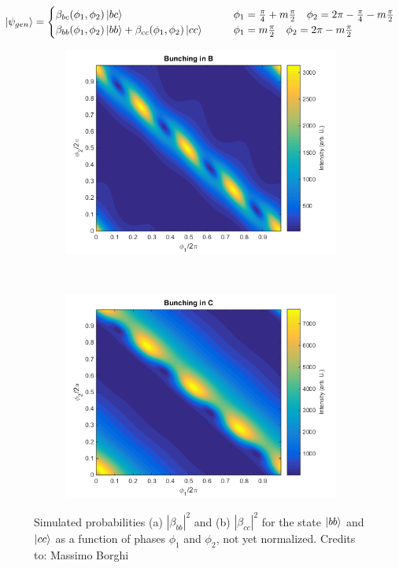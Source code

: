 \[\ket{\psi_{gen}} = \begin{cases}
\beta_{bc}(\phi_1,\phi_2)\ket{bc} &\qquad  \phi_1 =  \frac{\pi}{4} + m\frac{\pi}{2} \quad \phi_2 = 2\pi - \frac{\pi}{4} - m\frac{\pi}{2} \\
\beta_{bb}(\phi_1,\phi_2)\ket{bb} +\beta_{cc}(\phi_1,\phi_2)\ket{cc} &\qquad \phi_1 = m\frac{\pi}{2} \quad \phi_2 = 2\pi - m\frac{\pi}{2} \\
\end{cases}\]

\begin{figure}
\centering
\begin{subfigure}{0.49\textwidth}
\centering
\includegraphics[width = \textwidth]{img/Bunching_B}
\caption{}
\end{subfigure}\,
\begin{subfigure}{0.49\textwidth}
\includegraphics[width = \textwidth]{img/Bunching_C}
\caption{}
\end{subfigure}
\caption{Simulated probabilities (a) $|\beta_{bb}|^2$ and (b) $|\beta_{cc}|^2$ for the state $\ket{bb}$ and $\ket{cc}$ as a function of phases $\phi_1$ and $\phi_2$, not yet normalized. Credits to: Massimo Borghi}\label{bounchstates}
\end{figure}

